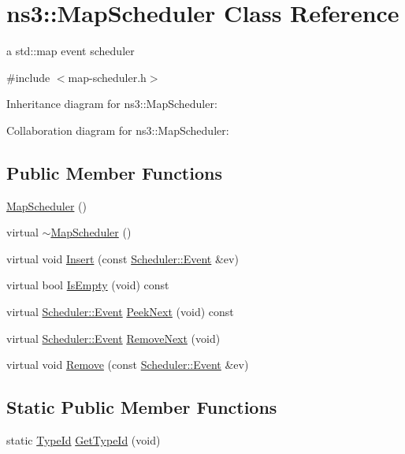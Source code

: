 \hypertarget{classns3_1_1MapScheduler}{}\section{ns3\+:\+:Map\+Scheduler Class Reference}
\label{classns3_1_1MapScheduler}


a std\+::map event scheduler  




{\ttfamily \#include $<$map-\/scheduler.\+h$>$}



Inheritance diagram for ns3\+:\+:Map\+Scheduler\+:


Collaboration diagram for ns3\+:\+:Map\+Scheduler\+:
\subsection*{Public Member Functions}
\begin{DoxyCompactItemize}
\item 
\hyperlink{classns3_1_1MapScheduler_a08c618a7e050714de5cc44d3d7dd5b12}{Map\+Scheduler} ()
\item 
virtual \hyperlink{classns3_1_1MapScheduler_aa17258a7ddceaed79daff251547e0048}{$\sim$\+Map\+Scheduler} ()
\item 
virtual void \hyperlink{classns3_1_1MapScheduler_aa980b7cd4f3f7d2f71c6fe6a4de814bb}{Insert} (const \hyperlink{structns3_1_1Scheduler_1_1Event}{Scheduler\+::\+Event} \&ev)
\item 
virtual bool \hyperlink{classns3_1_1MapScheduler_a9522bb68ce8c8c1eb4c621d2a8cb3c38}{Is\+Empty} (void) const 
\item 
virtual \hyperlink{structns3_1_1Scheduler_1_1Event}{Scheduler\+::\+Event} \hyperlink{classns3_1_1MapScheduler_a466bd1c7f6826b053da5b825016ab4f6}{Peek\+Next} (void) const 
\item 
virtual \hyperlink{structns3_1_1Scheduler_1_1Event}{Scheduler\+::\+Event} \hyperlink{classns3_1_1MapScheduler_a0fff1cb7fcb512e768f3d22898c20f08}{Remove\+Next} (void)
\item 
virtual void \hyperlink{classns3_1_1MapScheduler_aa5a93d600ff5a8b4d1f79181b71cb397}{Remove} (const \hyperlink{structns3_1_1Scheduler_1_1Event}{Scheduler\+::\+Event} \&ev)
\end{DoxyCompactItemize}
\subsection*{Static Public Member Functions}
\begin{DoxyCompactItemize}
\item 
static \hyperlink{classns3_1_1TypeId}{Type\+Id} \hyperlink{classns3_1_1MapScheduler_a4d57f849a2e3ddfe4542de1224fd7e10}{Get\+Type\+Id} (void)
\end{DoxyCompactItemize}
